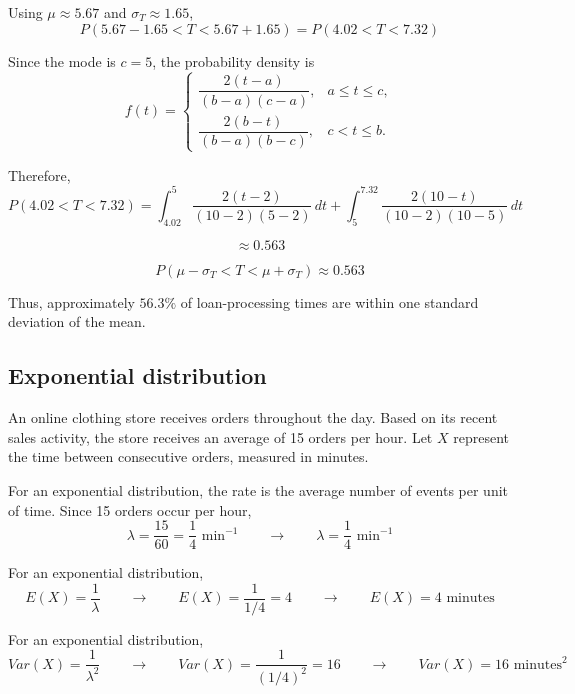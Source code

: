 Using $\mu\approx5.67$ and $\sigma_T\approx1.65$,
\[
P(5.67-1.65<T<5.67+1.65)
=
P(4.02<T<7.32)
\]

Since the mode is $c=5$, the probability density is
\[
f(t)=
\begin{cases}
	\dfrac{2(t-a)}{(b-a)(c-a)}, & a\leq t\leq c,\\[2mm]
	\dfrac{2(b-t)}{(b-a)(b-c)}, & c<t\leq b.
\end{cases}
\]

Therefore,
\[
P(4.02<T<7.32)
=
\int_{4.02}^{5}
\frac{2(t-2)}{(10-2)(5-2)}\,dt
+
\int_{5}^{7.32}
\frac{2(10-t)}{(10-2)(10-5)}\,dt
\]

\[
\approx0.563
\]

\[
\boxed{P(\mu-\sigma_T<T<\mu+\sigma_T)\approx0.563}
\]

Thus, approximately $56.3\%$ of loan-processing times are within one
standard deviation of the mean.


\subsection{Exponential distribution}\label{sec:c4-problem-exponential}


An online clothing store receives orders throughout the day. Based on its
recent sales activity, the store receives an average of 15 orders per
hour. Let $X$ represent the time between consecutive orders, measured in
minutes.

For an exponential distribution, the rate is the average number of events
per unit of time. Since 15 orders occur per hour,
\[
\lambda=\frac{15}{60}
=\frac14\text{ min}^{-1}
\qquad \longrightarrow \qquad
\boxed{\lambda=\frac14\text{ min}^{-1}}
\]



For an exponential distribution,
\[
E(X)=\frac{1}{\lambda}
\qquad \longrightarrow \qquad
E(X)
=\frac{1}{1/4}
=4
\qquad \longrightarrow \qquad
\boxed{E(X)=4\text{ minutes}}
\]


For an exponential distribution,
\[
Var(X)=\frac{1}{\lambda^2}
\qquad \longrightarrow \qquad
Var(X)
=\frac{1}{(1/4)^2}
=16
\qquad \longrightarrow \qquad
\boxed{Var(X)=16\text{ minutes}^2}
\]


